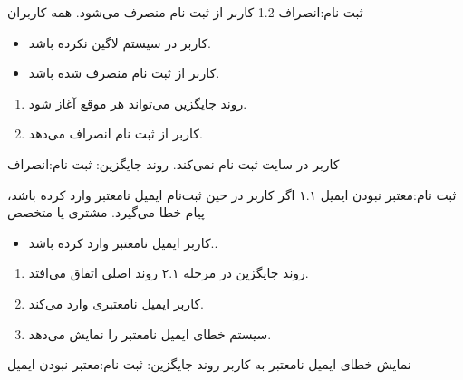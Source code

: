 {\alternativeflow
{
	ثبت نام:انصراف
}
{1.2}
{
	کاربر از ثبت نام منصرف می‌شود.
}
{
	همه کاربران
}
{}
{
	\begin{itemize}
		\vspace*{-0.6cm}
		\item 
		کاربر در سیستم لاگین نکرده باشد.
		\item
		کاربر از ثبت نام  منصرف شده باشد.
	\end{itemize}
}
{
	\vspace*{-0.6cm}
	\begin{enumerate}
		\item 
		روند جایگزین می‌تواند هر موقع آغاز شود.
		\item
		کاربر از ثبت نام  انصراف می‌دهد.
	\end{enumerate}
}
{
	کاربر در سایت ثبت نام نمی‌کند.
}
{
	روند جایگزین: ثبت نام:انصراف
}

\alternativeflow
{
	ثبت‌ نام:معتبر نبودن ایمیل
}
{۱.۱}
{
	اگر کاربر در حین ثبت‌نام ایمیل نامعتبر وارد کرده باشد، پیام خطا می‌گیرد.
}
{
	مشتری یا متخصص
}
{}
{
	\begin{itemize}
	
		\item
		کاربر ایمیل نامعتبر وارد کرده باشد..
	\end{itemize}
}
{
	\vspace*{-0.6cm}
	\begin{enumerate}
		\item 
		روند جایگزین در مرحله ۲.۱ روند اصلی اتفاق می‌افتد.
		\item
		کاربر ایمیل نامعتبری وارد می‌کند.
		\item 
		سیستم خطای ایمیل نامعتبر را نمایش می‌دهد.
	\end{enumerate}
}
{
	نمایش خطای ایمیل نامعتبر به کاربر
}
{
	روند جایگزین: 	ثبت‌ نام:معتبر نبودن ایمیل
}
}

